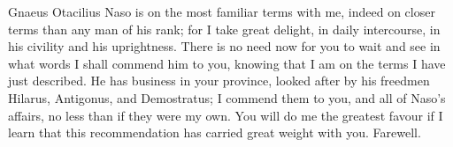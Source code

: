 

 Gnaeus Otacilius Naso is on the most familiar terms with me, indeed on closer terms than any man of his rank; for I take great delight, in daily intercourse, in his civility and his uprightness. There is no need now for you to wait and see in what words I shall commend him to you, knowing that I am on the terms I have just described. He has business in your province, looked after by his freedmen Hilarus, Antigonus, and Demostratus; I commend them to you, and all of Naso's affairs, no less than if they were my own. You will do me the greatest favour if I learn that this recommendation has carried great weight with you. Farewell.
